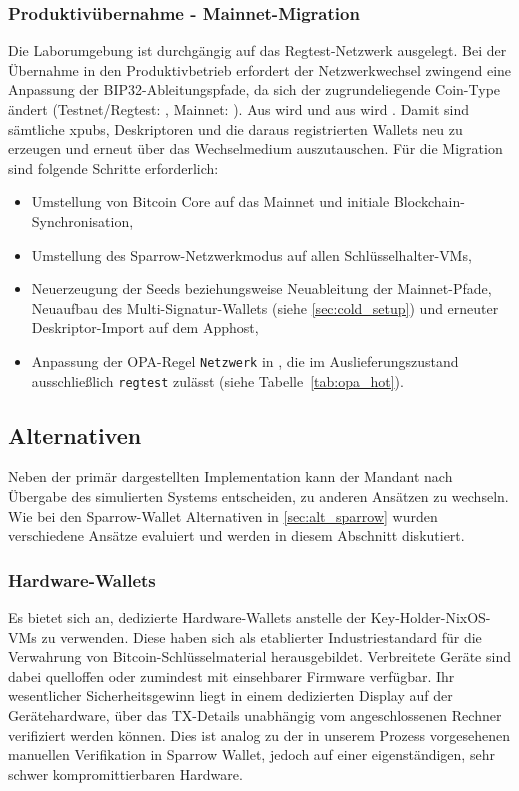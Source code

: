 \subsubsection{Produktivübernahme - Mainnet-Migration} \label{sec:mainnet_migration}
Die Laborumgebung ist durchgängig auf das Regtest-Netzwerk ausgelegt. Bei der Übernahme in den Produktivbetrieb erfordert der Netzwerkwechsel zwingend eine Anpassung der \ac{BIP}32-Ableitungspfade, da sich der zugrundeliegende Coin-Type ändert (Testnet/Regtest: , Mainnet: ). 
Aus  wird  und aus  wird . Damit sind sämtliche \acp{xpub}, Deskriptoren und die daraus registrierten Wallets neu zu erzeugen und erneut über das Wechselmedium auszutauschen. Für die Migration sind
folgende Schritte erforderlich:
\begin{itemize}
    \item Umstellung von Bitcoin Core auf das Mainnet und initiale
          Blockchain-Synchronisation,
    \item Umstellung des Sparrow-Netzwerkmodus auf allen Schlüsselhalter-\acp{VM},
    \item Neuerzeugung der Seeds beziehungsweise Neuableitung der Mainnet-Pfade,
          Neuaufbau des Multi-Signatur-Wallets (siehe \ref{sec:cold_setup}) und
          erneuter Deskriptor-Import auf dem Apphost,
    \item Anpassung der \ac{OPA}-Regel \texttt{Netzwerk} in ,
          die im Auslieferungszustand ausschließlich \texttt{regtest} zulässt
          (siehe Tabelle~\ref{tab:opa_hot}).
\end{itemize}

\subsection{Alternativen} \label{sec:alt_alg}
Neben der primär dargestellten Implementation kann der Mandant nach Übergabe des simulierten Systems entscheiden, zu anderen Ansätzen zu wechseln. Wie bei den Sparrow-Wallet Alternativen in \ref{sec:alt_sparrow} wurden verschiedene Ansätze evaluiert und werden in diesem Abschnitt diskutiert.

\subsubsection{Hardware-Wallets}
Es bietet sich an, dedizierte Hardware-Wallets anstelle der Key-Holder-NixOS-\acp{VM} zu verwenden. Diese haben sich als etablierter Industriestandard für die Verwahrung von Bitcoin-Schlüsselmaterial
herausgebildet. Verbreitete Geräte sind dabei quelloffen oder zumindest mit einsehbarer Firmware verfügbar. Ihr wesentlicher Sicherheitsgewinn liegt in einem dedizierten Display auf der Gerätehardware, über das \ac{TX}-Details unabhängig vom angeschlossenen Rechner verifiziert werden können. Dies ist analog zu der in unserem Prozess vorgesehenen manuellen Verifikation in Sparrow Wallet,
jedoch auf einer eigenständigen, sehr schwer kompromittierbaren Hardware.

